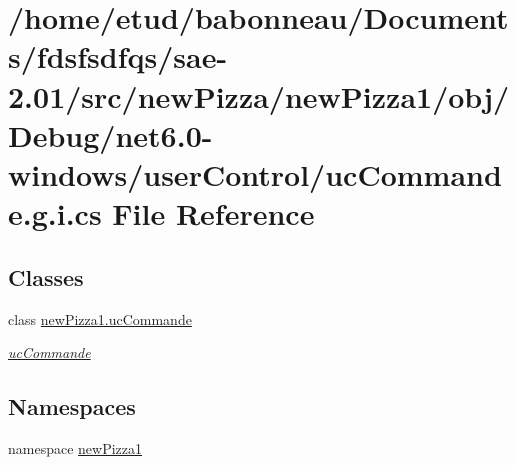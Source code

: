 \hypertarget{net6_80-windows_2userControl_2ucCommande_8g_8i_8cs}{}\section{/home/etud/babonneau/\+Documents/fdsfsdfqs/sae-\/2.01/src/new\+Pizza/new\+Pizza1/obj/\+Debug/net6.0-\/windows/user\+Control/uc\+Commande.g.\+i.\+cs File Reference}
\label{net6_80-windows_2userControl_2ucCommande_8g_8i_8cs}
\subsection*{Classes}
\begin{DoxyCompactItemize}
\item 
class \hyperlink{classnewPizza1_1_1ucCommande}{new\+Pizza1.\+uc\+Commande}
\begin{DoxyCompactList}\small\item\em \hyperlink{classnewPizza1_1_1ucCommande}{uc\+Commande} \end{DoxyCompactList}\end{DoxyCompactItemize}
\subsection*{Namespaces}
\begin{DoxyCompactItemize}
\item 
namespace \hyperlink{namespacenewPizza1}{new\+Pizza1}
\end{DoxyCompactItemize}
